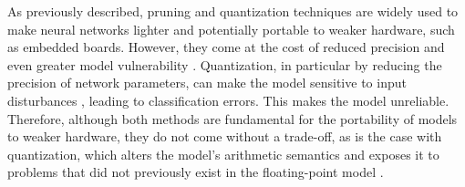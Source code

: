 {As previously described, pruning and quantization techniques are widely used to make neural networks lighter and potentially portable to weaker hardware, such as embedded boards. However, they come at the cost of reduced precision and even greater model vulnerability \cite{abdi2021counterexample}. Quantization, in particular by reducing the precision of network parameters, can make the model sensitive to input disturbances \cite{giacobbe2020how}, leading to classification errors. This makes the model unreliable. Therefore, although both methods are fundamental for the portability of models to weaker hardware, they do not come without a trade-off, as is the case with quantization, which alters the model's arithmetic semantics and exposes it to problems that did not previously exist in the floating-point model \cite{abdi2021counterexample, cordeiro2025neuralnetworkverificationprogramming}.}




